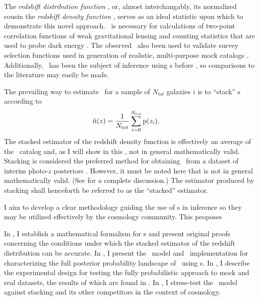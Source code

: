 The \textit{redshift distribution function \Nz}, or, almost interchangably, its normalized cousin the \textit{redshift density function \nz}, serves as an ideal statistic upon which to demonstrate this novel approach.  
\Nz\ is necessary for calculations of two-point correlation functions of weak gravitational lensing and counting statistics that are used to probe dark energy \citep{Masters2015}.  
The observed \Nz\ also been used to validate survey selection functions used in generation of realistic, multi-purpose mock catalogs \citep{Norberg2002}.  
Additionally, \Nz\ has been the subject of inference using \pzpdf s before \citep{Sheldon2012, Hildebrandt2012, Kelly2014, Benjamin2013, Bonnett2015a, Viironen2015, Asorey2016, Leistedt2016}, so comparisons to the literature may easily be made. 

The prevailing way to estimate \nz\ for a sample of $N_{tot}$ galaxies $i$ is to ``stack'' \pzpdf s according to
\begin{align}
\eqlabel{eqn:stack}
\hat{n}(z) &= \frac{1}{\ntot} \sum_{i = 0}^{\ntot} \pr{z_{i}} .
\end{align}
The stacked estimator of the redshift density function is effectively an average of the \pzpdf\ catalog and, as I will show in this \paper, not in general mathematically valid.
Stacking is considered the preferred method for obtaining \Nz\ from a dataset of interim photo-$z$ posteriors \citep{Sheldon2012, Kelly2014, Benjamin2013, Bonnett2015a, Viironen2015, Asorey2016}.  
However, it must be noted here that  is not in general mathematically valid.  
(See \citet{Hogg2012} for a complete discussion.)  
The estimator produced by stacking shall henceforth be referred to as the ``stacked'' estimator.


I aim to develop a clear methodology guiding the use of \pzpdf s in inference so they may be utilized effectively by the cosmology community.
This \paper peoposes

In , I establish a mathematical formalism for \pzpdf s and present original proofs concerning the conditions under which the stacked estimator of the redshift distribution can be accurate.
In , I present the \Chippr\ model and \chippr\ implementation for characterizing the full posterior probability landscape of \Nz\ using \pzpdf s. 
In , I describe the experimental design for testing the fully probabilistic approach to mock and real datasets, the results of which are found in .
In , I stress-test the \Chippr\ model against stacking and its other competitors in the context of cosmology.


